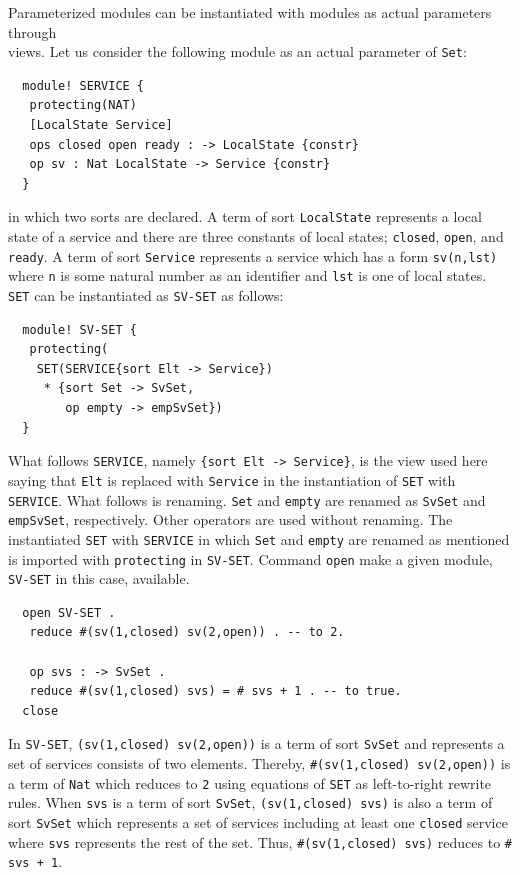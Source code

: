 \documentclass[12pt]{report}
\newcommand{\stt}[1]{{\small{\tt {#1}}}}
\begin{document}
Parameterized modules can be instantiated with modules as actual
parameters through\\ views. Let us consider the following module
as an actual parameter of {\tt Set}:
\small
\begin{verbatim}
  module! SERVICE {
   protecting(NAT)
   [LocalState Service]
   ops closed open ready : -> LocalState {constr}
   op sv : Nat LocalState -> Service {constr}
  }
\end{verbatim}
\normalsize
in which two sorts are declared.  A term of sort {\tt LocalState}
represents a local state of a service and there are three constants of
local states; {\tt closed}, {\tt open}, and {\tt ready}.  A term of
sort {\tt Service} represents a service which has a form
\stt{sv(n,lst)} where {\tt n} is some natural number as an identifier
and {\tt lst} is one of local states.  {\tt SET} can be instantiated
as {\tt SV-SET} as follows:
\small
\begin{verbatim}
  module! SV-SET {
   protecting(
    SET(SERVICE{sort Elt -> Service})
     * {sort Set -> SvSet,
        op empty -> empSvSet})
  }
\end{verbatim}
\normalsize
What follows {\tt SERVICE}, namely \stt{\{sort Elt -> Service\}}, is
the view used here saying that {\tt Elt} is replaced with
{\tt Service} in the instantiation of {\tt SET} with
{\tt SERVICE}. What follows {\tt *} is renaming. {\tt Set} and
{\tt empty} are renamed as {\tt SvSet} and {\tt empSvSet},
respectively. Other operators are used without renaming.
The instantiated {\tt SET} with {\tt SERVICE} in which {\tt Set} and
{\tt empty} are renamed as mentioned is imported with {\tt protecting}
in {\tt SV-SET}. Command {\tt open} make a given module, {\tt SV-SET}
in this case, available.
\small
\begin{verbatim}
  open SV-SET .
   reduce #(sv(1,closed) sv(2,open)) . -- to 2.

   op svs : -> SvSet .
   reduce #(sv(1,closed) svs) = # svs + 1 . -- to true.
  close
\end{verbatim}
\normalsize
In {\tt SV-SET}, \stt{(sv(1,closed) sv(2,open))} is a term of sort
{\tt SvSet} and represents a set of services consists of two elements.
Thereby, \stt{\#(sv(1,closed) sv(2,open))} is a term of {\tt Nat} which
reduces to {\tt 2} using equations of {\tt SET} as left-to-right
rewrite rules. When {\tt svs} is a term of sort {\tt SvSet},
\stt{(sv(1,closed) svs)} is also a term of sort {\tt SvSet} which
represents a set of services including at least one {\tt closed}
service where {\tt svs} represents the rest of the set. Thus,
\stt{\#(sv(1,closed) svs)} reduces to \stt{\# svs + 1}.
\end{document}
